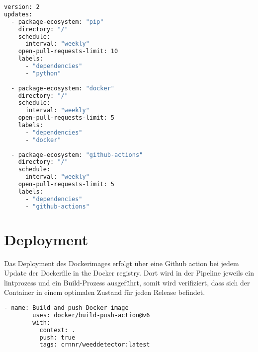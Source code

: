 \documentclass[12pt, a4paper]{scrreprt}
\begin{document}
\begin{lstlisting}[language=Bash, caption=Bandit via GitHub Actions]
version: 2
updates:
  - package-ecosystem: "pip"
    directory: "/"
    schedule:
      interval: "weekly"
    open-pull-requests-limit: 10
    labels:
      - "dependencies"
      - "python"
    
  - package-ecosystem: "docker"
    directory: "/"
    schedule:
      interval: "weekly"
    open-pull-requests-limit: 5
    labels:
      - "dependencies"
      - "docker"
      
  - package-ecosystem: "github-actions"
    directory: "/"
    schedule:
      interval: "weekly"
    open-pull-requests-limit: 5
    labels:
      - "dependencies"
      - "github-actions"
\end{lstlisting}

\section{Deployment}
Das Deployment des Dockerimages erfolgt über eine Github action bei jedem Update der Dockerfile in the Docker registry. Dort wird in der Pipeline jeweils ein lintprozess und ein Build-Prozess ausgeführt, somit wird verifiziert, dass sich der Container in einem optimalen Zustand für jeden Release befindet.

\begin{lstlisting}[language=Bash, caption=Bandit via GitHub Actions]
      - name: Build and push Docker image
        uses: docker/build-push-action@v6
        with:
          context: .
          push: true
          tags: crnnr/weeddetector:latest
\end{lstlisting}
\end{document}
